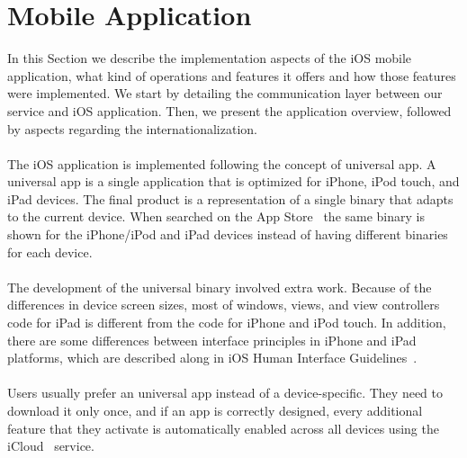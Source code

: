 \section{Mobile Application}
\label{sec:iosApplication}
In this Section we describe the implementation aspects of the iOS mobile application, what kind of operations and features it offers and how those features were implemented. We start by detailing the communication layer between our service and iOS application. Then, we present the application overview, followed by aspects regarding the internationalization.\\
\\
The iOS application is implemented following the concept of universal app. A universal app is a single application that is optimized for iPhone, iPod touch, and iPad devices. The final product is a representation of a single binary that adapts to the current device. When searched on the App Store~\cite{appleAppStore} the same binary is shown for the iPhone/iPod and iPad devices instead of having different binaries for each device.\\
\\
The development of the universal binary involved extra work. Because of the differences in device screen sizes, most of windows, views, and view controllers code for iPad is different from the code for iPhone and iPod touch. In addition, there are some differences between interface principles in iPhone and iPad platforms, which are described along in iOS Human Interface Guidelines~\cite{appleiOSGuideLines}.\\
\\
Users usually prefer an universal app instead of a device-specific. They need to download it only once, and if an app is correctly designed, every additional feature that they activate is automatically enabled across all devices using the iCloud~\cite{appleiCloud} service.
